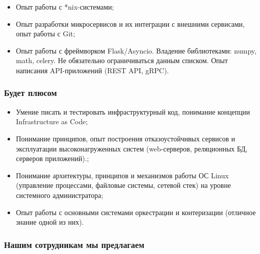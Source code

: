 \documentclass[a4paper,8pt]{article}
\begin{document}
    \begin{itemize}
        \item Опыт работы с *nix-системами;
        \item Опыт разработки микросервисов и их интеграции с внешними сервисами, опыт работы с Git;
        \item Опыт работы с фреймворком Flask/Asyncio. Владение библиотеками: numpy, math, celery. Не обязательно ограничиваться данным списком. Опыт написания API-приложений (REST API, gRPC).
    \end{itemize}

\subsubsection*{Будет плюсом}

    \begin{itemize}

        \item Умение писать и тестировать инфраструктурный код, понимание концепции Infrastructure as Code;
        \item Понимание принципов, опыт построения отказоустойчивых сервисов и эксплуатации высоконагруженных систем (web-серверов, реляционных БД, серверов приложений).;
        \item Понимание архитектуры, принципов и механизмов работы ОС Linux (управление процессами, файловые системы, сетевой стек) на уровне системного администратора;
        \item Опыт работы с основными системами оркестрации и контеризации (отличное знание одной из них).
    \end{itemize}


\subsubsection*{Нашим сотрудникам мы предлагаем}
\end{document}

